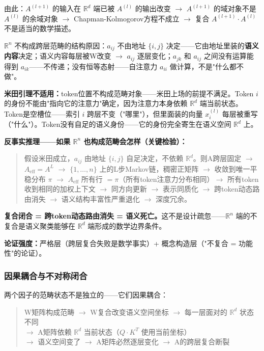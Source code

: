 \documentclass[11pt,a4paper]{article}
\theoremstyle{definition}
\begin{document}
由此：$A^{(l+1)}$ 的输入在 $\mathbb{R}^d$ 端已被 $A^{(l)}$ 的输出改变 $\to$ $A^{(l+1)}$ 的域对象不是 $A^{(l)}$ 的余域对象 $\to$ Chapman-Kolmogorov方程不成立 $\to$ 复合 $A^{(l+1)} \cdot A^{(l)}$ 不是适当的数学描述。

$\mathbb{R}^n$ 不构成跨层范畴的结构原因：$a_{ij}$ 不由地址 $\{i, j\}$ 决定——它由地址里装的\textbf{语义内容}决定；语义内容每层被W改变 $\to$ $a_{ij}$ 逐层变化；$a_{jk}$ 和 $a_{ij}$ 之间没有运算能得到 $a_{ik}$——不传递；没有恒等态射——自注意力 $a_{ii}$ 做计算，不是"什么都不做"。

\textbf{米田引理不适用：}token位置不构成范畴对象——米田上场的前提不满足。Token $i$ 的身份不能由"指向它的注意力"确定，因为注意力本身依赖 $\mathbb{R}^d$ 端当前状态。Token是空槽位——索引 $i$ 跨层不变（"哪里"），但里面装的向量 $x_i^{(l)}$ 每层被重写（"什么"）。Token没有自足的语义身份——它的身份完全寄生在语义空间 $\mathbb{R}^d$ 上。

\textbf{反事实推理——如果 $\mathbb{R}^n$ 也构成范畴会怎样（关键检验）：}
\begin{quote}
假设米田成立，$a_{ij}$ 由地址 $\{i, j\}$ 自足决定，不依赖 $\mathbb{R}^d$。则A跨层固定 $\to$ $A_{\text{eff}} = A^L$ $\to$ $\{1,\ldots,n\}$ 上的L步Markov链，稠密正矩阵 $\to$ 收敛到唯一平稳分布 $\pi$ $\to$ $A_{\text{eff}}$ 所有行 $= \pi$（所有token注意力分布相同）$\to$ 所有token收到相同的加权上下文 $\to$ 同方向更新 $\to$ 表示同质化 $\to$ 跨token动态路由消失 $\to$ 语义结构丰富性严重退化 $\to$ 深度冗余。
\end{quote}

\textbf{复合闭合 = 跨token动态路由消失 = 语义死亡。}这不是设计疏忽——$\mathbb{R}^n$ 端的不复合是语义聚类能够在 $\mathbb{R}^d$ 端形成的数学边界条件。

\textbf{论证强度：}严格层（跨层复合失败是数学事实）+ 概念构造层（"不复合 = 功能性"的论证）。

\subsubsection{因果耦合与不对称闭合}
\label{sec:causal_coupling}

两个因子的范畴状态不是独立的——它们因果耦合：

\begin{quote}
W矩阵构成范畴 $\to$ W复合改变语义空间坐标 $\to$ 每一层面对的 $\mathbb{R}^d$ 状态不同 \\
$\to$ A矩阵依赖 $\mathbb{R}^d$ 当前状态（$Q \cdot K^T$ 使用当前坐标）\\
$\to$ 语义空间变了 $\to$ A矩阵必然逐层变化 $\to$ A的跨层复合断裂
\end{quote}
\end{document}
